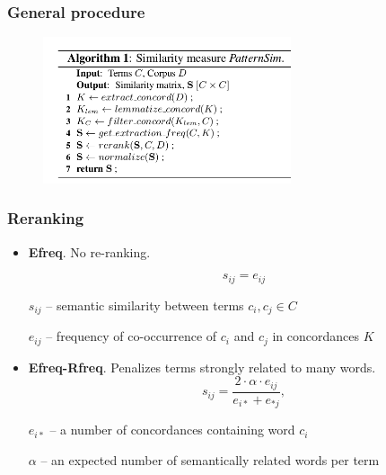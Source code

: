\documentclass{beamer}
\begin{document}
\begin{frame}
\frametitle{General procedure}

\begin{figure}	
	\centering
		\includegraphics[width=0.65\textwidth]{figures/algo}
\end{figure}

\end{frame}

\begin{frame}
\frametitle{Reranking }

\begin{itemize}
\item \textbf{Efreq}. No re-ranking. 

$$s_{ij} = e_{ij}$$

$s_{ij}$ -- semantic similarity between terms $c_i, c_j \in C$

$e_{ij}$ --  frequency of co-occurrence of $c_i$ and $c_j$ in concordances $K$ 

\item \textbf{Efreq-Rfreq}. Penalizes terms strongly related to many words.
$$
s_{ij} = \frac{2\cdot\alpha\cdot e_{ij}}{e_{i*} + e_{*j}},
$$

$e_{i*}$ -- a number of concordances containing word $c_i$

$\alpha$ -- an expected number of semantically related words per term 
 
\end{itemize}

\end{frame}
\end{document}
